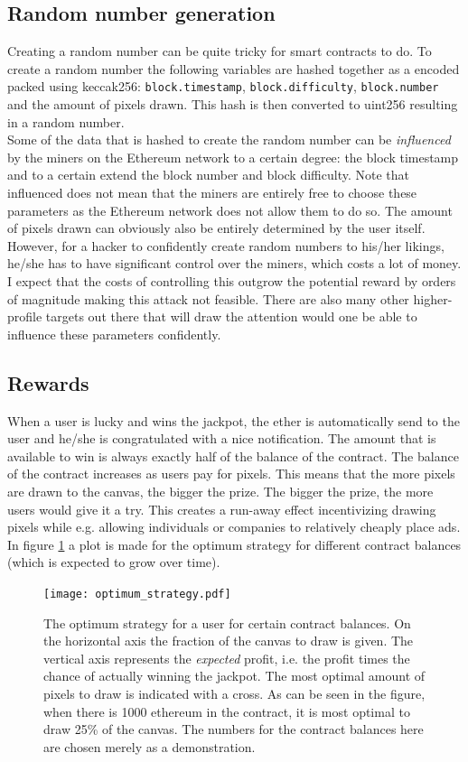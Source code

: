 \documentclass[a4paper]{article}
\begin{document}
\subsection{Random number generation}
Creating a random number can be quite tricky for smart contracts to do. To create a random number the following variables are hashed together as a encoded packed using keccak256: \lstinline{block.timestamp}, \lstinline{block.difficulty}, \lstinline{block.number} and the amount of pixels drawn. This hash is then converted to uint256 resulting in a random number. \\
Some of the data that is hashed to create the random number can be \emph{influenced} by the miners on the Ethereum network to a certain degree: the block timestamp and to a certain extend the block number and block difficulty. Note that influenced does not mean that the miners are entirely free to choose these parameters as the Ethereum network does not allow them to do so. The amount of pixels drawn can obviously also be entirely determined by the user itself. However, for a hacker to confidently create random numbers to his/her likings, he/she has to have significant control over the miners, which costs a lot of money. I expect that the costs of controlling this outgrow the potential reward by orders of magnitude making this attack not feasible. There are also many other higher-profile targets out there that will draw the attention would one be able to influence these parameters confidently.

\subsection{Rewards}
When a user is lucky and wins the jackpot, the ether is automatically send to the user and he/she is congratulated with a nice notification. The amount that is available to win is always exactly half of the balance of the contract. The balance of the contract increases as users pay for pixels. This means that the more pixels are drawn to the canvas, the bigger the prize. The bigger the prize, the more users would give it a try. This creates a run-away effect incentivizing drawing pixels while e.g. allowing individuals or companies to relatively cheaply place ads. In figure \ref{fig:2} a plot is made for the optimum strategy for different contract balances (which is expected to grow over time).

\begin{figure}[H]%
    \centering
    \texttt{[image: optimum\_strategy.pdf]} %
     \caption{The optimum strategy for a user for certain contract balances. On the horizontal axis the fraction of the canvas to draw is given. The vertical axis represents the \emph{expected} profit, i.e. the profit times the chance of actually winning the jackpot. The most optimal amount of pixels to draw is indicated with a cross. As can be seen in the figure, when there is 1000 ethereum in the contract, it is most optimal to draw 25\% of the canvas. The numbers for the contract balances here are chosen merely as a demonstration.}%
    \label{fig:2}%
\end{figure}
\end{document}
